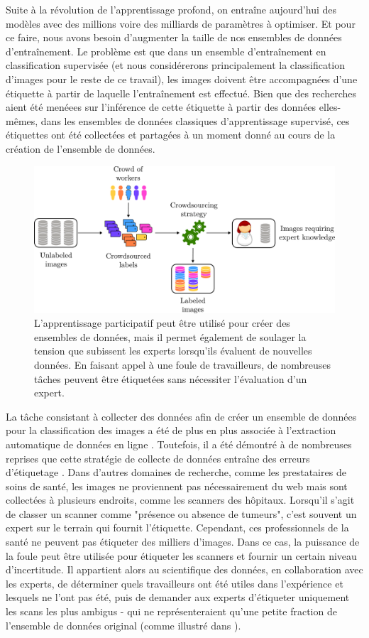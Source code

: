 Suite à la révolution de l'apprentissage profond, on entraîne aujourd'hui des modèles avec des millions voire des milliards de paramètres à optimiser. Et pour ce faire, nous avons besoin d'augmenter la taille de nos ensembles de données d'entraînement.
Le problème est que dans un ensemble d'entraînement en classification supervisée (et nous considérerons principalement la classification d'images pour le reste de ce travail), les images doivent être accompagnées d'une étiquette à partir de laquelle l'entraînement est effectué.
Bien que des recherches aient été menéees sur l'inférence de cette étiquette à partir des données elles-mêmes, dans les ensembles de données classiques d'apprentissage supervisé, ces étiquettes ont été collectées et partagées à un moment donné au cours de la création de l'ensemble de données.

\begin{figure}[ht]
    \centering
    \includegraphics[width=.8\textwidth]{chapters/images/expert_knowledge.pdf}
    \caption{L'apprentissage participatif peut être utilisé pour créer des ensembles de données, mais il permet également de soulager la tension que subissent les experts lorsqu'ils évaluent de nouvelles données. En faisant appel à une foule de travailleurs, de nombreuses tâches peuvent être étiquetées sans nécessiter l'évaluation d'un expert.}
\end{figure}

La tâche consistant à collecter des données afin de créer un ensemble de données pour la classification des images a été de plus en plus associée à l'extraction automatique de données en ligne \citep{rhodes2015vaping}.
Toutefois, il a été démontré à de nombreuses reprises que cette stratégie de collecte de données entraîne des erreurs d'étiquetage \citep{northcutt_pervasive_2021,vasudevan2022does}.
Dans d'autres domaines de recherche, comme les prestataires de soins de santé, les images ne proviennent pas nécessairement du web mais sont collectées à plusieurs endroits, comme les scanners des hôpitaux.
Lorsqu'il s'agit de classer un scanner comme "présence ou absence de tumeurs", c'est souvent un expert sur le terrain qui fournit l'étiquette.
Cependant, ces professionnels de la santé ne peuvent pas étiqueter des milliers d'images.
Dans ce cas, la puissance de la foule peut être utilisée pour étiqueter les scanners et fournir un certain niveau d'incertitude.
Il appartient alors au scientifique des données, en collaboration avec les experts, de déterminer quels travailleurs ont été utiles dans l'expérience et lesquels ne l'ont pas été, puis de demander aux experts d'étiqueter uniquement les scans les plus ambigus - qui ne représenteraient qu'une petite fraction de l'ensemble de données original (comme illustré dans ).

